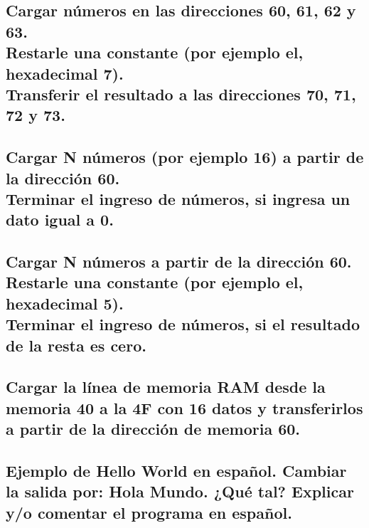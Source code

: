 \documentclass{article}
\begin{document}
\setcounter{section}{2}
\setcounter{subsection}{0}
\subsection{Cargar números en las direcciones 60, 61, 62 y 63.\\
            Restarle una constante (por ejemplo el, hexadecimal 7).\\
            Transferir el resultado a las direcciones 70, 71, 72 y 73.}

\subsection{Cargar N números (por ejemplo 16) a partir de la dirección 60.\\
            Terminar el ingreso de números, si ingresa un dato igual a 0.}

\subsection{Cargar N números a partir de la dirección 60.\\
            Restarle una constante (por ejemplo el, hexadecimal 5).\\
            Terminar el ingreso de números, si el resultado de la resta es cero.}

\subsection{Cargar la línea de memoria RAM desde la memoria 40 a la 4F con 16 datos y transferirlos a partir de la dirección de memoria 60.}

\subsection{Ejemplo de Hello World en español. Cambiar la salida por: Hola Mundo. ¿Qué tal? Explicar y/o comentar el programa en español.}
\end{document}
